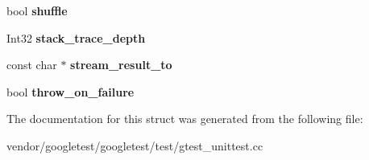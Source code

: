 \begin{DoxyCompactItemize}
\mbox{\label{structtesting_1_1_flags_a51c689e47e0f55c16116ac2a1d3b05d6}} 
bool {\bfseries shuffle}
\item 
\mbox{\label{structtesting_1_1_flags_a20c6592453909c1adace64bf6a2bc2de}} 
Int32 {\bfseries stack\+\_\+trace\+\_\+depth}
\item 
\mbox{\label{structtesting_1_1_flags_ab09849fd3e095d5628dec65ec4dce9e1}} 
const char $\ast$ {\bfseries stream\+\_\+result\+\_\+to}
\item 
\mbox{\label{structtesting_1_1_flags_ab8e7d21e31e641efe47b8050759e001a}} 
bool {\bfseries throw\+\_\+on\+\_\+failure}
\end{DoxyCompactItemize}


The documentation for this struct was generated from the following file\+:\begin{DoxyCompactItemize}
\item 
vendor/googletest/googletest/test/gtest\+\_\+unittest.\+cc\end{DoxyCompactItemize}
